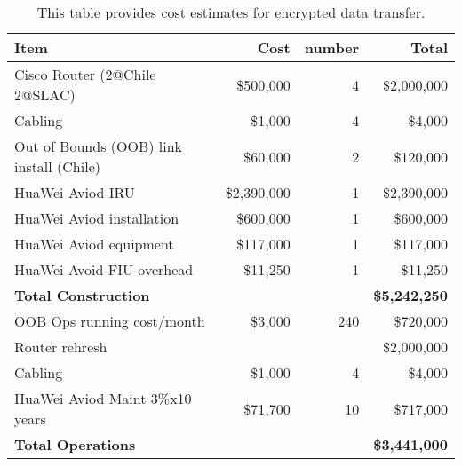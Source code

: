 \tiny \begin{longtable} {|l|r|r|r|} \caption{This table provides cost estimates for encrypted data transfer. \label{tab:ipsec}}\\ 
\hline 
\textbf{Item}&\textbf{Cost}&\textbf{number}&\textbf{Total} \\ \hline
{Cisco Router (2@Chile 2@SLAC) }&{\$500,000}&{4}&{\$2,000,000} \\ \hline
{Cabling}&{\$1,000}&{4}&{\$4,000} \\ \hline
{Out of Bounds (OOB) link  install (Chile)}&{\$60,000}&{2}&{\$120,000} \\ \hline
{HuaWei Aviod IRU}&{\$2,390,000}&{1}&{\$2,390,000} \\ \hline
{HuaWei Aviod installation}&{\$600,000}&{1}&{\$600,000} \\ \hline
{HuaWei Aviod equipment}&{\$117,000}&{1}&{\$117,000} \\ \hline
{HuaWei Avoid FIU overhead}&{\$11,250}&{1}&{\$11,250} \\ \hline
\textbf{Total Construction}&\textbf{}&\textbf{}&\textbf{\$5,242,250} \\ \hline
{OOB Ops running cost/month}&{\$3,000}&{240}&{\$720,000} \\ \hline
{Router rehresh}&{}&{ }&{\$2,000,000} \\ \hline
{Cabling}&{\$1,000}&{4}&{\$4,000} \\ \hline
{HuaWei Aviod Maint 3\%x10 years}&{\$71,700}&{10}&{\$717,000} \\ \hline
\textbf{Total Operations}&\textbf{}&\textbf{}&\textbf{\$3,441,000} \\ \hline
\end{longtable} \normalsize
